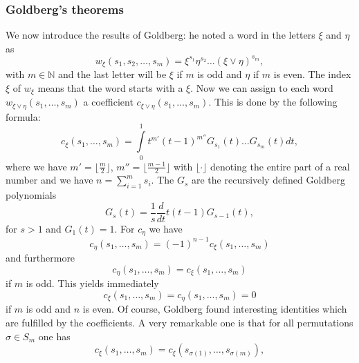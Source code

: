 \subsubsection{Goldberg's theorems}
We now introduce the results of Goldberg: he noted a word in the letters $\xi$ 
and $\eta$ as
\begin{equation*}
	w_{\xi}(s_1, s_2, \ldots, s_m)
	=
	\xi^{s_1} \eta^{s_2} \ldots (\xi \vee \eta)^{s_m},
\end{equation*}
with $m \in \mathbb{N}$ and the last letter will be $\xi$ if $m$ is odd and 
$\eta$ if $m$ is even. The index $\xi$ of $w_{\xi}$ means that the word 
starts with a $\xi$. Now we can assign to each word $w_{\xi \vee \eta}(s_1, 
\ldots, s_m)$ a coefficient $c_{\xi \vee \eta}(s_1, \ldots, s_m)$. This is 
done by the following formula:
\begin{equation}
	\label{Alg:GoldbergCoeff1}
	c_{\xi}(s_1, \ldots, s_m) 
	= 
	\int\limits_0^1 
	t^{m'} (t - 1)^{m''} 
	G_{s_1}(t) \ldots G_{s_m}(t) dt,
\end{equation}
where we have $m' = \lfloor \frac{m}{2} \rfloor$, $m'' = \lfloor \frac{m-1}{2} 
\rfloor$ with $\lfloor \cdot \rfloor$ denoting the entire part of a real 
number and we have $n = \sum_{i = 1}^m s_i$. The $G_s$ are the recursively 
defined Goldberg polynomials
\begin{equation}
	\label{Alg:GoldbergPolynomials}
	G_s(t) 
	= 
	\frac{1}{s} 
	\frac{d}{dt} 
	t(t-1) G_{s-1}(t),
\end{equation}
for $s > 1$ and $G_1(t) = 1$. For $c_{\eta}$ we have
\begin{equation}
	\label{Alg:GoldbergCoeff2}
	c_{\eta}\left( s_1, \ldots, s_m \right)
	= 
	(-1)^{n-1} c_{\xi} \left( s_1, \ldots, s_m \right)
\end{equation}
and furthermore
\begin{equation*}
	c_{\eta}\left( s_1, \ldots, s_m \right)
	= 
	c_{\xi} \left( s_1, \ldots, s_m \right)
\end{equation*}
if $m$ is odd. This yields immediately
\begin{equation*}
	c_{\xi}\left( s_1, \ldots, s_m \right)
	= 
	c_{\eta}\left( s_1, \ldots, s_m \right) 
	= 
	0 
\end{equation*}
if $m$ is odd and $n$ is even. Of course, Goldberg found interesting identities 
which are fulfilled by the coefficients. A very remarkable one is that for all 
permutations $\sigma \in S_m$ one has
\begin{equation*}
	c_{\xi}\left( s_1, \ldots, s_m \right)
	=
	c_{\xi}\left( s_{\sigma(1)}, \ldots, s_{\sigma(m)} \right),
\end{equation*}
